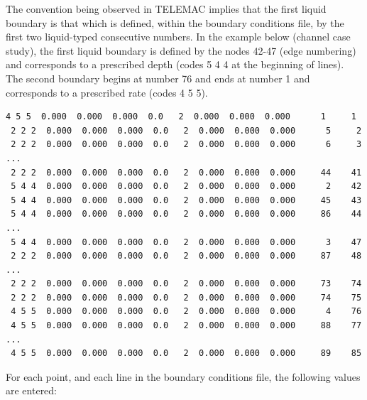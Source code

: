 The convention being observed in TELEMAC implies that the first liquid boundary
is that which is defined, within the boundary conditions file, by the first two
liquid-typed consecutive numbers. In the example below (channel case study),
the first liquid boundary is defined by the nodes 42-47 (edge numbering) and
corresponds to a prescribed depth (codes 5 4 4 at the beginning of lines). The
second boundary begins at number 76 and ends at number 1 and corresponds to a
prescribed rate (codes 4 5 5).

\begin{lstlisting}[language=bash]
 4 5 5  0.000  0.000  0.000  0.0   2  0.000  0.000  0.000      1     1
 2 2 2  0.000  0.000  0.000  0.0   2  0.000  0.000  0.000      5     2
 2 2 2  0.000  0.000  0.000  0.0   2  0.000  0.000  0.000      6     3
...
 2 2 2  0.000  0.000  0.000  0.0   2  0.000  0.000  0.000     44    41
 5 4 4  0.000  0.000  0.000  0.0   2  0.000  0.000  0.000      2    42
 5 4 4  0.000  0.000  0.000  0.0   2  0.000  0.000  0.000     45    43
 5 4 4  0.000  0.000  0.000  0.0   2  0.000  0.000  0.000     86    44
...
 5 4 4  0.000  0.000  0.000  0.0   2  0.000  0.000  0.000      3    47
 2 2 2  0.000  0.000  0.000  0.0   2  0.000  0.000  0.000     87    48
...
 2 2 2  0.000  0.000  0.000  0.0   2  0.000  0.000  0.000     73    74
 2 2 2  0.000  0.000  0.000  0.0   2  0.000  0.000  0.000     74    75
 4 5 5  0.000  0.000  0.000  0.0   2  0.000  0.000  0.000      4    76
 4 5 5  0.000  0.000  0.000  0.0   2  0.000  0.000  0.000     88    77
...
 4 5 5  0.000  0.000  0.000  0.0   2  0.000  0.000  0.000     89    85
\end{lstlisting}

For each point, and each line in the boundary conditions file, the following
values are entered:


